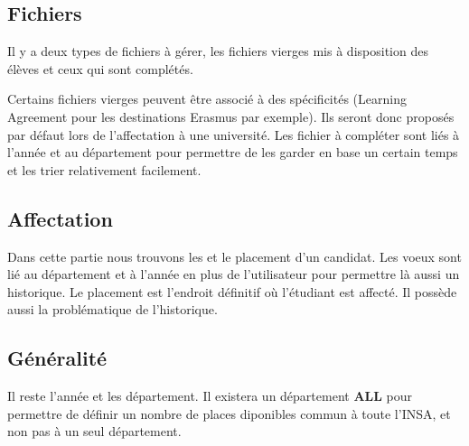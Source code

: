 \subsection{Fichiers}

Il y a deux types de fichiers à gérer, les fichiers vierges mis à disposition des élèves et ceux qui sont complétés.

Certains fichiers vierges peuvent être associé à des spécificités (Learning Agreement pour les destinations Erasmus par exemple). Ils seront donc proposés par défaut lors de l'affectation à une université.
Les fichier à compléter sont liés à l'année et au département pour permettre de les garder en base un certain temps et les trier relativement facilement.

\subsection{Affectation}

Dans cette partie nous trouvons les \voe et le placement d'un candidat. Les voeux sont lié au département et à l'année en plus de l'utilisateur pour permettre là aussi un historique.
Le placement est l'endroit définitif où l'étudiant est affecté. Il possède aussi la problématique de l'historique.

\subsection{Généralité}

Il reste l'année et les département. 
Il existera un département \textbf{ALL} pour permettre de définir un nombre de places diponibles commun à toute l'INSA, et non pas à un seul département.


